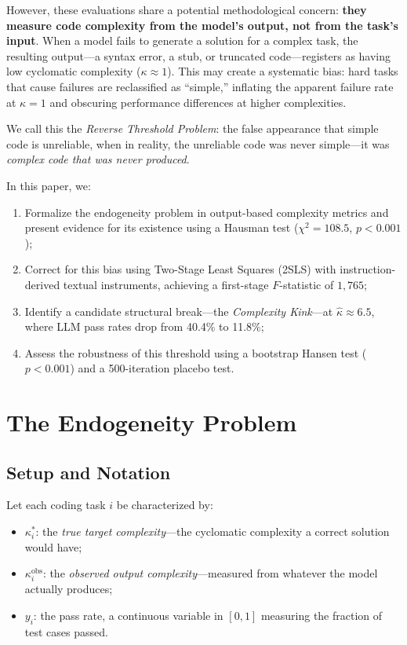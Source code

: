 \documentclass[conference]{IEEEtran}
\begin{document}
However, these evaluations share a potential methodological concern: \textbf{they measure code complexity from the model's output, not from the task's input}. When a model fails to generate a solution for a complex task, the resulting output---a syntax error, a stub, or truncated code---registers as having low cyclomatic complexity ($\kappa \approx 1$). This may create a systematic bias: hard tasks that cause failures are reclassified as ``simple,'' inflating the apparent failure rate at $\kappa = 1$ and obscuring performance differences at higher complexities.

We call this the \emph{Reverse Threshold Problem}: the false appearance that simple code is unreliable, when in reality, the unreliable code was never simple---it was \emph{complex code that was never produced}.

In this paper, we:
\begin{enumerate}
    \item Formalize the endogeneity problem in output-based complexity metrics and present evidence for its existence using a Hausman test ($\chi^2 = 108.5$, $p < 0.001$);
    \item Correct for this bias using Two-Stage Least Squares (2SLS) with instruction-derived textual instruments, achieving a first-stage $F$-statistic of $1{,}765$;
    \item Identify a candidate structural break---the \emph{Complexity Kink}---at $\hat{\kappa} \approx 6.5$, where LLM pass rates drop from 40.4\% to 11.8\%;
    \item Assess the robustness of this threshold using a bootstrap Hansen test ($p < 0.001$) and a 500-iteration placebo test.
\end{enumerate}

\section{The Endogeneity Problem}
\label{sec:endogeneity}

\subsection{Setup and Notation}

Let each coding task $i$ be characterized by:
\begin{itemize}
    \item $\kappa_i^*$: the \emph{true target complexity}---the cyclomatic complexity a correct solution would have;
    \item $\kappa_i^{\text{obs}}$: the \emph{observed output complexity}---measured from whatever the model actually produces;
    \item $y_i$: the pass rate, a continuous variable in $[0, 1]$ measuring the fraction of test cases passed.
\end{itemize}
\end{document}
